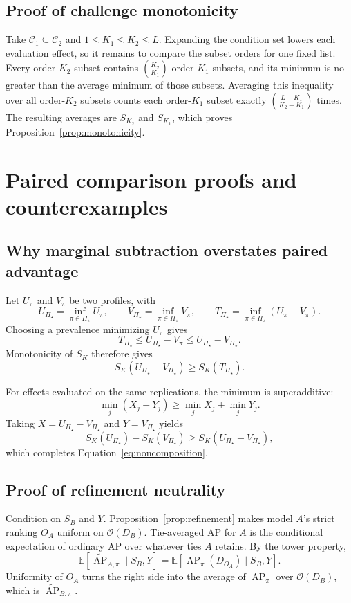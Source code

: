 \documentclass[11pt]{article}
\newcommand{\AP}{\operatorname{AP}}
\newcommand{\PSet}{\Pi_\star}
\newcommand{\E}{\mathbb{E}}
\newcommand{\APta}{\widetilde{\AP}}
\theoremstyle{remark}
\begin{document}
\subsection{Proof of challenge monotonicity}

Take $\mathcal C_1\subseteq\mathcal C_2$ and
$1\leq K_1\leq K_2\leq L$. Expanding the condition set lowers each
evaluation effect, so it remains to compare the subset orders for one fixed
list. Every order-$K_2$ subset contains $\binom{K_2}{K_1}$ order-$K_1$
subsets, and its minimum is no greater than the average minimum of those
subsets. Averaging this inequality over all order-$K_2$ subsets counts each
order-$K_1$ subset exactly $\binom{L-K_1}{K_2-K_1}$ times. The resulting
averages are $S_{K_2}$ and $S_{K_1}$, which proves
Proposition~\ref{prop:monotonicity}.

\section{Paired comparison proofs and counterexamples}
\label{app:paired-proofs}

\subsection{Why marginal subtraction overstates paired advantage}

Let $U_\pi$ and $V_\pi$ be two profiles, with
\[
U_{\PSet}=\inf_{\pi\in\PSet}U_\pi,
\qquad
V_{\PSet}=\inf_{\pi\in\PSet}V_\pi,
\qquad
T_{\PSet}=\inf_{\pi\in\PSet}(U_\pi-V_\pi).
\]
Choosing a prevalence minimizing $U_\pi$ gives
\[
T_{\PSet}
\leq
U_{\PSet}-V_\pi
\leq
U_{\PSet}-V_{\PSet}.
\]
Monotonicity of $S_K$ therefore gives
\[
S_K(U_{\PSet}-V_{\PSet})
\geq
S_K(T_{\PSet}).
\]

For effects evaluated on the same replications, the minimum is superadditive:
\[
\min_j(X_j+Y_j)
\geq
\min_jX_j+\min_jY_j.
\]
Taking $X=U_{\PSet}-V_{\PSet}$ and $Y=V_{\PSet}$ yields
\[
S_K(U_{\PSet})-S_K(V_{\PSet})
\geq
S_K(U_{\PSet}-V_{\PSet}),
\]
which completes Equation~\eqref{eq:noncomposition}.

\subsection{Proof of refinement neutrality}

Condition on $S_B$ and $Y$. Proposition~\ref{prop:refinement} makes model $A$'s strict ranking $O_A$ uniform on $\mathcal O(D_B)$. Tie-averaged AP for $A$ is the conditional expectation of ordinary AP over whatever ties $A$ retains. By the tower property,
\[
\E[\APta_{A,\pi}\mid S_B,Y]
=
\E[\AP_\pi(D_{O_A})\mid S_B,Y].
\]
Uniformity of $O_A$ turns the right side into the average of $\AP_\pi$ over $\mathcal O(D_B)$, which is $\APta_{B,\pi}$.
\end{document}
